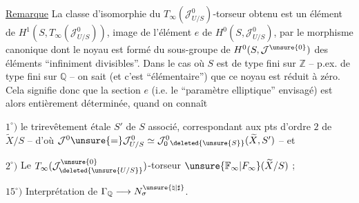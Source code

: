 
\uline{Remarque} La classe d'isomorphie du $T_\infty(\mathcal J^0_{U/S})$-torseur obtenu est un élément de $H^1(S,T_\infty(\mathcal J^0_{U/S}))$, image de l'élément $e$ de $H^0(S,\mathcal J^0_{U/S})$, par le morphisme canonique
dont le noyau est formé du sous-groupe de $H^0(S,\mathcal J^{\unsure{0}})$ des éléments ``infiniment divisibles''. Dans le cas où $S$ est  de type fini sur  $\mathbb Z$ -- p.ex.  de type fini sur $\mathbb Q$ -- on sait (et c'est  ``élémentaire'') que ce noyau est réduit à zéro. Cela signifie donc que la section $e$  (i.e. le ``paramètre elliptique'' envisagé) est alors entièrement déterminée, quand on connaît


$1^{\circ})$ le  trirevêtement étale $S'$ de $S$ associé, correspondant aux pts d'ordre $2$ de $\widetilde X/S$ -- d'où $\mathcal J^0\unsure{=}\mathcal J^0_{U/S}\simeq\mathcal J^0_0{}_{\deleted{\unsure{S}}}(\widetilde X,S')$ -- et

$2^{\circ})$ Le $T_\infty(\mathcal J^{\unsure{0}}_{\deleted{\unsure{U/S}}})$-torseur $\unsure{\mathbb F_\infty|F_\infty}(\widetilde X/S)$ ;


$15^{\circ})$ Interprétation de $\Gamma_{\mathbb Q}\longrightarrow N_\sigma^{\unsure{\natural|\sharp}}$.

